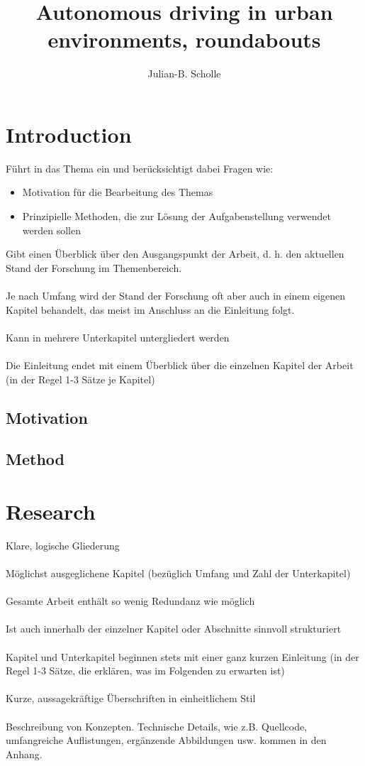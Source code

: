 \documentclass[a4paper,10pt]{scrreprt}
\title{Autonomous driving in urban environments, roundabouts}
\author{Julian-B. Scholle}
\begin{document}
\maketitle

\chapter{Introduction}
Führt in das Thema ein und berücksichtigt dabei Fragen wie:
\begin{itemize}
 \item Motivation für die Bearbeitung des Themas
 \item Prinzipielle Methoden, die zur Lösung der Aufgabenstellung verwendet werden sollen
\end{itemize}
Gibt einen Überblick über den Ausgangspunkt der Arbeit, d. h. den aktuellen Stand der Forschung im Themenbereich.\\\\
Je nach Umfang wird der Stand der Forschung oft aber auch in einem eigenen Kapitel behandelt, das meist im Anschluss an die Einleitung folgt.\\\\
Kann in mehrere Unterkapitel untergliedert werden\\\\
Die Einleitung endet mit einem Überblick über die einzelnen Kapitel der Arbeit (in der Regel 1-3 Sätze je Kapitel)

\section{Motivation}
\section{Method}
\chapter{Research}
Klare, logische Gliederung\\\\
Möglichst ausgeglichene Kapitel (bezüglich Umfang und Zahl der Unterkapitel)\\\\
Gesamte Arbeit enthält so wenig Redundanz wie möglich\\\\
Ist auch innerhalb der einzelner Kapitel oder Abschnitte sinnvoll strukturiert\\\\
Kapitel und Unterkapitel beginnen stets mit einer ganz kurzen Einleitung (in der Regel 1-3 Sätze, die erklären, was im Folgenden zu erwarten ist)\\\\
Kurze, aussagekräftige Überschriften in einheitlichem Stil\\\\
Beschreibung von Konzepten. Technische Details, wie z.B. Quellcode, umfangreiche Auflistungen, ergänzende Abbildungen usw. kommen in den Anhang.\\\\
\end{document}
